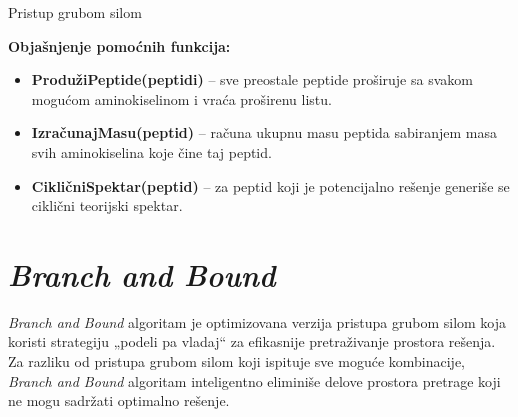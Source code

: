 \documentclass[12pt,oneside]{memoir}
\begin{document}
\begin{algorithm}[H]
\label{alg:brute_force}
\caption{Pristup grubom silom}
\SetAlgoLined
\DontPrintSemicolon
{}
\end{algorithm}

\noindent
\textbf{Objašnjenje pomoćnih funkcija:}
\begin{itemize}
  \item \textbf{ProdužiPeptide(peptidi)} – sve preostale peptide proširuje sa svakom mogućom aminokiselinom i vraća proširenu listu.
  \item \textbf{IzračunajMasu(peptid)} – računa ukupnu masu peptida sabiranjem masa svih aminokiselina koje čine taj peptid.
  \item \textbf{CikličniSpektar(peptid)} – za peptid koji je potencijalno rešenje generiše se ciklični teorijski spektar.
\end{itemize}

\section{\emph{Branch and Bound}}
\emph{Branch and Bound} algoritam \cite{online_lecture, online_book} je optimizovana verzija pristupa grubom silom koja koristi strategiju „podeli pa vladaj“ za efikasnije pretraživanje prostora rešenja. Za razliku od pristupa grubom silom koji ispituje sve moguće kombinacije, \emph{Branch and Bound} algoritam inteligentno eliminiše delove prostora pretrage koji ne mogu sadržati optimalno rešenje.
\end{document}
